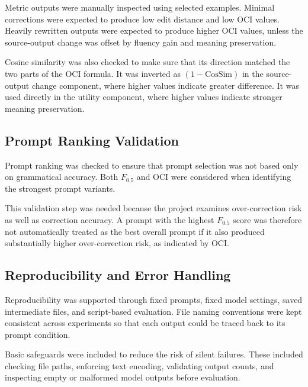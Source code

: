 Metric outputs were manually inspected using selected examples. Minimal corrections were expected to produce low edit distance and low OCI values. Heavily rewritten outputs were expected to produce higher OCI values, unless the source-output change was offset by fluency gain and meaning preservation.

Cosine similarity was also checked to make sure that its direction matched the two parts of the OCI formula. It was inverted as $(1 - \text{CosSim})$ in the source-output change component, where higher values indicate greater difference. It was used directly in the utility component, where higher values indicate stronger meaning preservation.

\subsection{Prompt Ranking Validation}

Prompt ranking was checked to ensure that prompt selection was not based only on grammatical accuracy. Both $F_{0.5}$ and OCI were considered when identifying the strongest prompt variants.

This validation step was needed because the project examines over-correction risk as well as correction accuracy. A prompt with the highest $F_{0.5}$ score was therefore not automatically treated as the best overall prompt if it also produced substantially higher over-correction risk, as indicated by OCI.

\subsection{Reproducibility and Error Handling}

Reproducibility was supported through fixed prompts, fixed model settings, saved intermediate files, and script-based evaluation. File naming conventions were kept consistent across experiments so that each output could be traced back to its prompt condition.

Basic safeguards were included to reduce the risk of silent failures. These included checking file paths, enforcing text encoding, validating output counts, and inspecting empty or malformed model outputs before evaluation.
